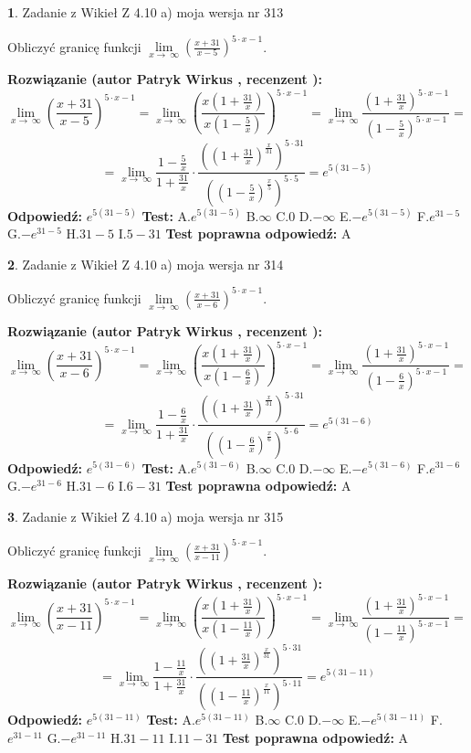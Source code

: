 \documentclass[12pt, a4paper]{article}
\theoremstyle{definition} %
\newtheorem{zad}{}
\newcommand{\zadStart}[1]{\begin{zad}#1\newline}
\newcommand{\zadStop}{\end{zad}}
\newcommand{\rozwStart}[2]{\noindent \textbf{Rozwiązanie (autor #1 , recenzent #2): }\newline}
\newcommand{\rozwStop}{\newline}
\newcommand{\odpStart}{\noindent \textbf{Odpowiedź:}\newline}
\newcommand{\odpStop}{\newline}
\newcommand{\testStart}{\noindent \textbf{Test:}\newline}
\newcommand{\testStop}{\newline}
\newcommand{\kluczStart}{\noindent \textbf{Test poprawna odpowiedź:}\newline}
\newcommand{\kluczStop}{\newline}
\begin{document}
\zadStart{Zadanie z Wikieł Z 4.10 a) moja wersja nr 313}


Obliczyć granicę funkcji  $\lim\limits_{x\to\ \infty}(\frac{x+31}{x-5})^{5\cdot x-1}$.
\zadStop
\rozwStart{Patryk Wirkus}{}
$$\lim\limits_{x\to\ \infty}(\frac{x+31}{x-5})^{5\cdot x-1} = \lim\limits_{x\to\ \infty}(\frac{x(1+\frac{31}{x})}{x(1-\frac{5}{x})})^{5\cdot x-1}=\lim\limits_{x\to\ \infty}\frac{(1+\frac{31}{x})^{5\cdot x-1}}{(1-\frac{5}{x})^{5\cdot x-1}}=$$
$$=\lim\limits_{x\to\ \infty}\frac{1-\frac{5}{x}}{1+\frac{31}{x}}\cdot\frac{((1+\frac{31}{x})^{\frac{x}{31}})^{5\cdot31}}{((1-\frac{5}{x})^{\frac{x}{5}})^{5\cdot5}}=e^{5(31-5)}$$
\rozwStop
\odpStart
$e^{5(31-5)}$
\odpStop
\testStart
A.$e^{5(31-5)}$ B.$\infty$ C.$0$ D.$-\infty$ E.$-e^{5(31-5)}$
F.$e^{31-5}$ G.$-e^{31-5}$
H.$31-5$
I.$5-31$
\testStop
\kluczStart
A
\kluczStop



\zadStart{Zadanie z Wikieł Z 4.10 a) moja wersja nr 314}


Obliczyć granicę funkcji  $\lim\limits_{x\to\ \infty}(\frac{x+31}{x-6})^{5\cdot x-1}$.
\zadStop
\rozwStart{Patryk Wirkus}{}
$$\lim\limits_{x\to\ \infty}(\frac{x+31}{x-6})^{5\cdot x-1} = \lim\limits_{x\to\ \infty}(\frac{x(1+\frac{31}{x})}{x(1-\frac{6}{x})})^{5\cdot x-1}=\lim\limits_{x\to\ \infty}\frac{(1+\frac{31}{x})^{5\cdot x-1}}{(1-\frac{6}{x})^{5\cdot x-1}}=$$
$$=\lim\limits_{x\to\ \infty}\frac{1-\frac{6}{x}}{1+\frac{31}{x}}\cdot\frac{((1+\frac{31}{x})^{\frac{x}{31}})^{5\cdot31}}{((1-\frac{6}{x})^{\frac{x}{6}})^{5\cdot6}}=e^{5(31-6)}$$
\rozwStop
\odpStart
$e^{5(31-6)}$
\odpStop
\testStart
A.$e^{5(31-6)}$ B.$\infty$ C.$0$ D.$-\infty$ E.$-e^{5(31-6)}$
F.$e^{31-6}$ G.$-e^{31-6}$
H.$31-6$
I.$6-31$
\testStop
\kluczStart
A
\kluczStop



\zadStart{Zadanie z Wikieł Z 4.10 a) moja wersja nr 315}


Obliczyć granicę funkcji  $\lim\limits_{x\to\ \infty}(\frac{x+31}{x-11})^{5\cdot x-1}$.
\zadStop
\rozwStart{Patryk Wirkus}{}
$$\lim\limits_{x\to\ \infty}(\frac{x+31}{x-11})^{5\cdot x-1} = \lim\limits_{x\to\ \infty}(\frac{x(1+\frac{31}{x})}{x(1-\frac{11}{x})})^{5\cdot x-1}=\lim\limits_{x\to\ \infty}\frac{(1+\frac{31}{x})^{5\cdot x-1}}{(1-\frac{11}{x})^{5\cdot x-1}}=$$
$$=\lim\limits_{x\to\ \infty}\frac{1-\frac{11}{x}}{1+\frac{31}{x}}\cdot\frac{((1+\frac{31}{x})^{\frac{x}{31}})^{5\cdot31}}{((1-\frac{11}{x})^{\frac{x}{11}})^{5\cdot11}}=e^{5(31-11)}$$
\rozwStop
\odpStart
$e^{5(31-11)}$
\odpStop
\testStart
A.$e^{5(31-11)}$ B.$\infty$ C.$0$ D.$-\infty$ E.$-e^{5(31-11)}$
F.$e^{31-11}$ G.$-e^{31-11}$
H.$31-11$
I.$11-31$
\testStop
\kluczStart
A
\kluczStop
\end{document}
